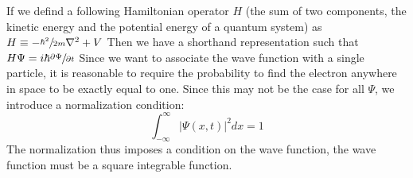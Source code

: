 \documentclass[11pt]{article}
\begin{document}
If we defind a following Hamiltonian operator $H$ (the sum of two components, the kinetic energy and the potential energy of a quantum system) as $H \equiv - \sfrac{\hbar^2}{2m} \nabla^2 + V$ Then we have a shorthand representation such that $H \Psi = i \hbar \sfrac{\partial \Psi}{\partial t}$ Since we want to associate the wave function with a single particle, it is reasonable to require the probability to find the electron anywhere in space to be exactly equal to one. Since this may not be the case for all $\Psi$, we introduce a normalization condition:
\begin{equation}
	\int_{- \infty}^{\infty} | \Psi (x,t) |^2 dx = 1
\end{equation}
The normalization thus imposes a condition on the wave function, the wave function must be a square integrable function.
\end{document}
